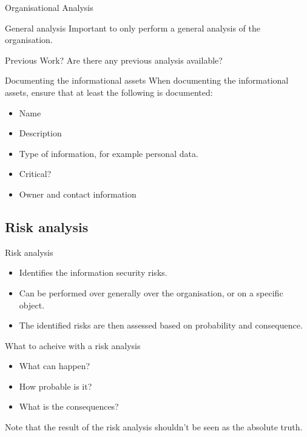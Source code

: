 \documentclass{beamer}
\begin{document}
\begin{frame}{Organisational Analysis}
  \begin{block}{General analysis}
    Important to only perform a general analysis of the organisation.
  \end{block}
  \begin{block}{Previous Work?}
    Are there any previous analysis available?
  \end{block}
\end{frame}

\begin{frame}{Documenting the informational assets}
  When documenting the informational assets, ensure that at least the following
  is documented:
  \begin{itemize}
    \item Name
    \item Description
    \item Type of information, for example personal data.
    \item Critical?
    \item Owner and contact information
  \end{itemize}
\end{frame}

\subsection{Risk analysis}
\begin{frame}{Risk analysis}
  \begin{itemize}
    \item Identifies the information security risks.
    \item Can be performed over generally over the organisation, or on a
      specific object.
    \item The identified risks are then assessed based on probability and
      consequence.
  \end{itemize}
  \begin{block}{What to acheive with a risk analysis}
    \begin{itemize}
      \item What can happen?
      \item How probable is it?
      \item What is the consequences?
    \end{itemize}
    Note that the result of the risk analysis shouldn't be seen as the absolute
    truth.
  \end{block}
\end{frame}
\end{document}
